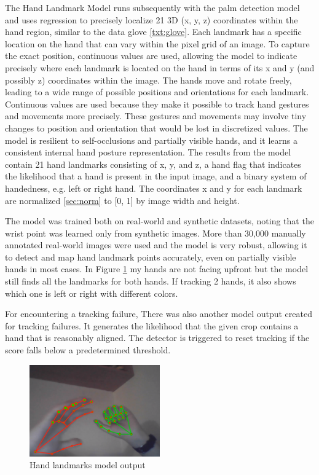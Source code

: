The Hand Landmark Model runs subsequently with the palm detection model and uses regression to precisely localize 21 3D (x, y, z) coordinates within the hand region, similar to the data glove \ref{txt:glove}. Each landmark has a specific location on the hand that can vary within the pixel grid of an image. To capture the exact position, continuous values are used, allowing the model to indicate precisely where each landmark is located on the hand in terms of its x and y (and possibly z) coordinates within the image. The hands move and rotate freely, leading to a wide range of possible positions and orientations for each landmark. Continuous values are used because they make it possible to track hand gestures and movements more precisely. These gestures and movements may involve tiny changes to position and orientation that would be lost in discretized values.
The model is resilient to self-occlusions and partially visible hands, and it learns a consistent internal hand posture representation. The results from the model contain 21 hand landmarks consisting of x, y, and z, a hand flag that indicates the likelihood that a hand is present in the input image, and a binary system of handedness, e.g. left or right hand.
The coordinates x and y for each landmark are normalized \ref{sec:norm} to [0, 1] by image width and height. 

The model was trained both on real-world and synthetic datasets, noting that the wrist point was learned only from synthetic images. More than 30,000 manually annotated real-world images were used and the model is very robust, allowing it to detect and map hand landmark points accurately, even on partially visible hands in most cases. In Figure
\ref{fig:landmark_both_hands} my hands are not facing upfront but the model still finds all the landmarks for both hands. If tracking 2 hands, it also shows which one is left or right with different colors.

For encountering a tracking failure, There was also another model output created for tracking failures. It generates the likelihood that the given crop contains a hand that is reasonably aligned. The detector is triggered to reset tracking if the score falls below a predetermined threshold.

\begin{figure}
	\centering
	\includegraphics[width = 0.5\textwidth]{images/landmarks_both_hands.png}
	\caption{Hand landmarks model output}
	\label{fig:landmark_both_hands}
\end{figure}

